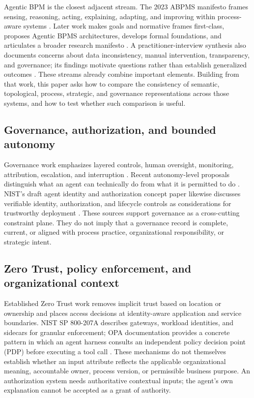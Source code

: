 \documentclass[11pt,letterpaper]{article}
\newcommand{\parencite}[1]{\citep{#1}}
\begin{document}
Agentic BPM is the closest adjacent stream. The 2023 ABPMS manifesto frames sensing, reasoning, acting, explaining, adapting, and improving within process-aware systems \parencite{dumas2023abpms}. Later work makes goals and normative frames first-class, proposes Agentic BPMS architectures, develops formal foundations, and articulates a broader research manifesto \parencite{calvanese2025normative,dumas2026abpms,degiacomo2026formal,calvanese2026manifesto}. A practitioner-interview synthesis also documents concerns about data inconsistency, manual intervention, transparency, and governance; its findings motivate questions rather than establish generalized outcomes \parencite{vu2025agentic}. These streams already combine important elements. Building from that work, this paper asks how to compare the consistency of semantic, topological, process, strategic, and governance representations across those systems, and how to test whether such comparison is useful.

\subsection{Governance, authorization, and bounded autonomy}
Governance work emphasizes layered controls, human oversight, monitoring, attribution, escalation, and interruption \parencite{shavit2023governance,schmitz2025oversight}. Recent autonomy-level proposals distinguish what an agent can technically do from what it is permitted to do \parencite{zheng2026permission}. NIST's draft agent identity and authorization concept paper likewise discusses verifiable identity, authorization, and lifecycle controls as considerations for trustworthy deployment \parencite{nist2026identity}. These sources support governance as a cross-cutting constraint plane. They do not imply that a governance record is complete, current, or aligned with process practice, organizational responsibility, or strategic intent.

\subsection{Zero Trust, policy enforcement, and organizational context}
Established Zero Trust work removes implicit trust based on location or ownership and places access decisions at identity-aware application and service boundaries. NIST SP 800-207A describes gateways, workload identities, and sidecars for granular enforcement; OPA documentation provides a concrete pattern in which an agent harness consults an independent policy decision point (PDP) before executing a tool call \parencite{nist207a2023,opa2026agent}. These mechanisms do not themselves establish whether an input attribute reflects the applicable organizational meaning, accountable owner, process version, or permissible business purpose. An authorization system needs authoritative contextual inputs; the agent's own explanation cannot be accepted as a grant of authority.
\end{document}
